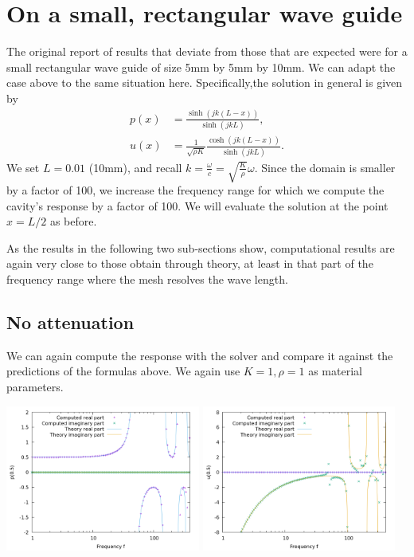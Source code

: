 \documentclass{article}
\begin{document}
\section{On a small, rectangular wave guide}

The original report of results that deviate from those that are
expected were for a small rectangular wave guide of size 5mm by 5mm by
10mm. We can adapt the case above to the same situation
here. Specifically,the solution in general is given by
\begin{align*}
  p(x)
  &=
  \frac{\sinh(jk(L-x))}{\sinh(jkL)},
  \\
  u(x)
  &=
  \frac{1}{\sqrt{\rho K}}
  \frac{\cosh(jk(L-x))}{\sinh(jkL)}.
\end{align*}
We set $L=0.01$ (10mm), and recall
$k=\frac{\omega}{c}=\sqrt{\frac{K}{\rho}}\omega$. Since the domain is
smaller by a factor of 100, we increase the frequency range for which
we compute the cavity's response by a factor of 100. We will evaluate
the solution at the point $x=L/2$ as before.

As the results in the following two sub-sections show, computational
results are again very close to those obtain through theory, at least
in that part of the frequency range where the mesh resolves the wave length.

\subsection{No attenuation}

We can again compute the response with the solver and compare it
against the predictions of the formulas above. We again use
$K=1,\rho=1$ as material parameters.

\begin{center}
\includegraphics[width=0.48\textwidth]{wave-guide/no-attenuation/pressure-at-center.png}
\includegraphics[width=0.48\textwidth]{wave-guide/no-attenuation/velocity-at-center.png}
\end{center}
\end{document}
